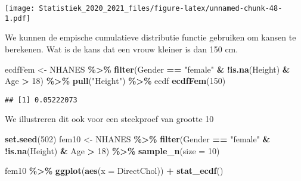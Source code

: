\documentclass[
  12pt,dutch,coursenotes]{book}
\newenvironment{Shaded}{\begin{snugshade}}{\end{snugshade}}
\newcommand{\DataTypeTok}[1]{\textcolor[rgb]{0.13,0.29,0.53}{#1}}
\newcommand{\DecValTok}[1]{\textcolor[rgb]{0.00,0.00,0.81}{#1}}
\newcommand{\KeywordTok}[1]{\textcolor[rgb]{0.13,0.29,0.53}{\textbf{#1}}}
\newcommand{\NormalTok}[1]{#1}
\newcommand{\OperatorTok}[1]{\textcolor[rgb]{0.81,0.36,0.00}{\textbf{#1}}}
\newcommand{\StringTok}[1]{\textcolor[rgb]{0.31,0.60,0.02}{#1}}
\theoremstyle{definition}
\theoremstyle{definition}
\theoremstyle{definition}
\theoremstyle{remark}
\begin{document}
\texttt{[image: Statistiek\_2020\_2021\_files/figure-latex/unnamed-chunk-48-1.pdf]}

We kunnen de empische cumulatieve distributie functie gebruiken om kansen te berekenen.
Wat is de kans dat een vrouw kleiner is dan 150 cm.

\begin{Shaded}
\begin{Highlighting}[]
\NormalTok{ecdfFem \textless{}{-}}\StringTok{ }\NormalTok{NHANES }\OperatorTok{\%\textgreater{}\%}\StringTok{ }\KeywordTok{filter}\NormalTok{(Gender }\OperatorTok{==}\StringTok{ "female"} \OperatorTok{\&}\StringTok{ }\OperatorTok{!}\KeywordTok{is.na}\NormalTok{(Height) }\OperatorTok{\&}\StringTok{ }
\StringTok{    }\NormalTok{Age }\OperatorTok{\textgreater{}}\StringTok{ }\DecValTok{18}\NormalTok{) }\OperatorTok{\%\textgreater{}\%}\StringTok{ }\KeywordTok{pull}\NormalTok{(}\StringTok{"Height"}\NormalTok{) }\OperatorTok{\%\textgreater{}\%}\StringTok{ }\NormalTok{ecdf}
\KeywordTok{ecdfFem}\NormalTok{(}\DecValTok{150}\NormalTok{)}
\end{Highlighting}
\end{Shaded}

\begin{verbatim}
## [1] 0.05222073
\end{verbatim}

We illustreren dit ook voor een steekproef van grootte 10

\begin{Shaded}
\begin{Highlighting}[]
\KeywordTok{set.seed}\NormalTok{(}\DecValTok{502}\NormalTok{)}
\NormalTok{fem10 \textless{}{-}}\StringTok{ }\NormalTok{NHANES }\OperatorTok{\%\textgreater{}\%}\StringTok{ }\KeywordTok{filter}\NormalTok{(Gender }\OperatorTok{==}\StringTok{ "female"} \OperatorTok{\&}\StringTok{ }\OperatorTok{!}\KeywordTok{is.na}\NormalTok{(Height) }\OperatorTok{\&}\StringTok{ }
\StringTok{    }\NormalTok{Age }\OperatorTok{\textgreater{}}\StringTok{ }\DecValTok{18}\NormalTok{) }\OperatorTok{\%\textgreater{}\%}\StringTok{ }\KeywordTok{sample\_n}\NormalTok{(}\DataTypeTok{size =} \DecValTok{10}\NormalTok{)}

\NormalTok{fem10 }\OperatorTok{\%\textgreater{}\%}\StringTok{ }\KeywordTok{ggplot}\NormalTok{(}\KeywordTok{aes}\NormalTok{(}\DataTypeTok{x =}\NormalTok{ DirectChol)) }\OperatorTok{+}\StringTok{ }\KeywordTok{stat\_ecdf}\NormalTok{()}
\end{Highlighting}
\end{Shaded}
\end{document}
